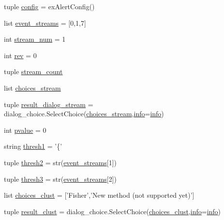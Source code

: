 \begin{DoxyCompactItemize}
\item 
tuple \hyperlink{namespacerun__archival_abe42e5e247442fb2afd7c8aa5322cd5f}{config} = ex\-Alert\-Config()
\item 
list \hyperlink{namespacerun__archival_a175f39c7d10885511c4623d3425db6ba}{event\-\_\-streams} = \mbox{[}0,1,7\mbox{]}
\item 
int \hyperlink{namespacerun__archival_a5a97b1e71d6ad7513865ee536b7b4dea}{stream\-\_\-num} = 1
\item 
int \hyperlink{namespacerun__archival_a0fe00f8ef6c40a90a1d41ecea3f75e7b}{rev} = 0
\item 
tuple \hyperlink{namespacerun__archival_a1aa2ba0984af9e6525f66fb7d1f912d5}{stream\-\_\-count}
\item 
list \hyperlink{namespacerun__archival_a18e24cc5c90db59c1cff4c0f69f82fa6}{choices\-\_\-stream}
\item 
tuple \hyperlink{namespacerun__archival_a1783f56496cd7db6da799a46bff93794}{result\-\_\-dialog\-\_\-stream} = dialog\-\_\-choice.\-Select\-Choice(\hyperlink{namespacerun__archival_a18e24cc5c90db59c1cff4c0f69f82fa6}{choices\-\_\-stream},\hyperlink{namespacerun__archival_a8ab6dc99642b199ed41dfc7ac9c88a92}{info}=\hyperlink{namespacerun__archival_a8ab6dc99642b199ed41dfc7ac9c88a92}{info})
\item 
int \hyperlink{namespacerun__archival_ac8f3f0889be632da0acd346f3ec2d0ae}{pvalue} = 0
\item 
string \hyperlink{namespacerun__archival_a345979c5efe939df4bbf314d62511433}{thresh1} = '\{'
\item 
tuple \hyperlink{namespacerun__archival_aa0af2b82ec84c97c5e9a4cffcec972c3}{thresh2} = str(\hyperlink{namespacerun__archival_a175f39c7d10885511c4623d3425db6ba}{event\-\_\-streams}\mbox{[}1\mbox{]})
\item 
tuple \hyperlink{namespacerun__archival_a59a2df7dced0835b40b789af0ee70d18}{thresh3} = str(\hyperlink{namespacerun__archival_a175f39c7d10885511c4623d3425db6ba}{event\-\_\-streams}\mbox{[}2\mbox{]})
\item 
list \hyperlink{namespacerun__archival_a1aba0598698cad93478f99a531838ef4}{choices\-\_\-clust} = \mbox{[}'Fisher','New method (not supported yet)'\mbox{]}
\item 
tuple \hyperlink{namespacerun__archival_a722e4f43ec0f9bfe74c6535f3ebe2f62}{result\-\_\-clust} = dialog\-\_\-choice.\-Select\-Choice(\hyperlink{namespacerun__archival_a1aba0598698cad93478f99a531838ef4}{choices\-\_\-clust},\hyperlink{namespacerun__archival_a8ab6dc99642b199ed41dfc7ac9c88a92}{info}=\hyperlink{namespacerun__archival_a8ab6dc99642b199ed41dfc7ac9c88a92}{info})

\end{DoxyCompactItemize}
